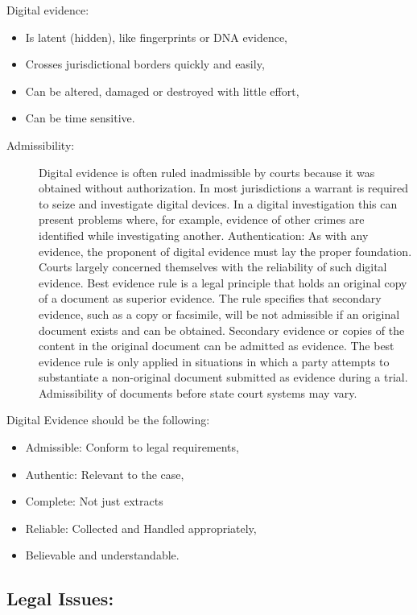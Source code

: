 \documentclass[british]{article}
\begin{document}
Digital evidence:
\begin{itemize}
\item Is latent (hidden), like fingerprints or DNA evidence,
\item Crosses jurisdictional borders quickly and easily,
\item Can be altered, damaged or destroyed with little effort,
\item Can be time sensitive.
\end{itemize}
\begin{description}
\item [{Admissibility:}] Digital evidence is often ruled inadmissible by
courts because it was obtained without authorization. In most jurisdictions
a warrant is required to seize and investigate digital devices. In
a digital investigation this can present problems where, for example,
evidence of other crimes are identified while investigating another.
Authentication: As with any evidence, the proponent of digital evidence
must lay the proper foundation. Courts largely concerned themselves
with the reliability of such digital evidence. Best evidence rule
is a legal principle that holds an original copy of a document as
superior evidence. The rule specifies that secondary evidence, such
as a copy or facsimile, will be not admissible if an original document
exists and can be obtained. \textquotedbl Secondary evidence\textquotedbl{}
or copies of the content in the original document can be admitted
as evidence. The best evidence rule is only applied in situations
in which a party attempts to substantiate a non-original document
submitted as evidence during a trial. Admissibility of documents before
state court systems may vary. 
\end{description}
Digital Evidence should be the following:
\begin{itemize}
\item Admissible: Conform to legal requirements,
\item Authentic: Relevant to the case,
\item Complete: Not just extracts
\item Reliable: Collected and Handled appropriately,
\item Believable and understandable.
\end{itemize}

\subsection{Legal Issues:}
\end{document}
